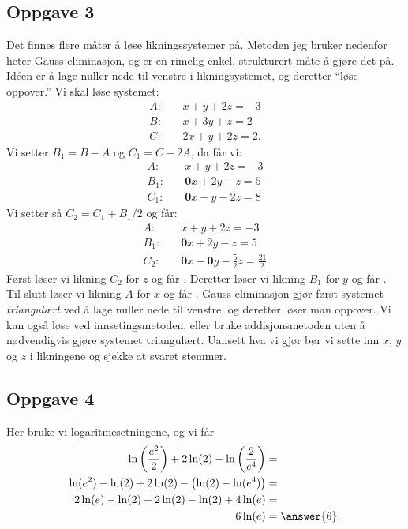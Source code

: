\subsection*{Oppgave 3}
Det finnes flere måter å løse likningssystemer på.
Metoden jeg bruker nedenfor heter Gauss-eliminasjon, og er en rimelig enkel, strukturert måte å gjøre det på. 
Idéen er å lage nuller nede til venstre i likningsystemet, og deretter ``løse oppover.''
Vi skal løse systemet:
\begin{align*}
	A:& \quad x  +   y  +  2z = -3 \\
	B:& \quad x  +    3y  +   z = 2 \\
	C:& \quad 2x   +  y  +   2z = 2 .
\end{align*}
Vi setter $B_1 = B - A$ og $C_1 = C - 2A$, da får vi:
\begin{align*}
A:& \quad x  +   y  +  2z = -3 \\
B_1:& \quad \mathbf{0}x  +    2y     -z = 5 \\
C_1:& \quad \mathbf{0}x   -  y    -2z = 8
\end{align*}
Vi setter så $C_2 = C_1 + B_1 / 2$ og får:
\begin{align*}
A:& \quad x  +   y  +  2z = -3 \\
B_1:& \quad \mathbf{0}x  +    2y     -z = 5 \\
C_2:& \quad \mathbf{0}x   -  \mathbf{0}y    -\frac{5}{2}z = \frac{21}{2}
\end{align*}
Først løser vi likning $C_2$ for $z$ og får .
Deretter løser vi likning $B_1$ for $y$ og får .
Til slutt løser vi likning $A$ for $x$ og får .
Gauss-eliminasjon gjør først systemet \emph{triangulært} ved å lage nuller nede til venstre, og deretter løser man oppover.
Vi kan også løse ved innsetingsmetoden, eller bruke addisjonsmetoden uten å nødvendigvis gjøre systemet triangulært.
Uansett hva vi gjør bør vi sette inn $x$, $y$ og $z$ i likningene og sjekke at svaret stemmer.


\subsection*{Oppgave 4}
Her bruke vi logaritmesetningene, og vi får
\begin{align*}
	\ln \left(\frac{e^2}{2}\right) + 2 \ln (2) - \ln \left(\frac{2}{e^4}\right) &=  \\
	\ln(e^2) - \ln(2) + 2\ln(2) - \left( \ln (2) - \ln (e^4)\right) &= \\
	2 \ln(e) - \ln(2) + 2\ln(2) - \ln (2) + 4 \ln (e) &= \\
	6 \ln(e) &= \answer{6} .
\end{align*}

